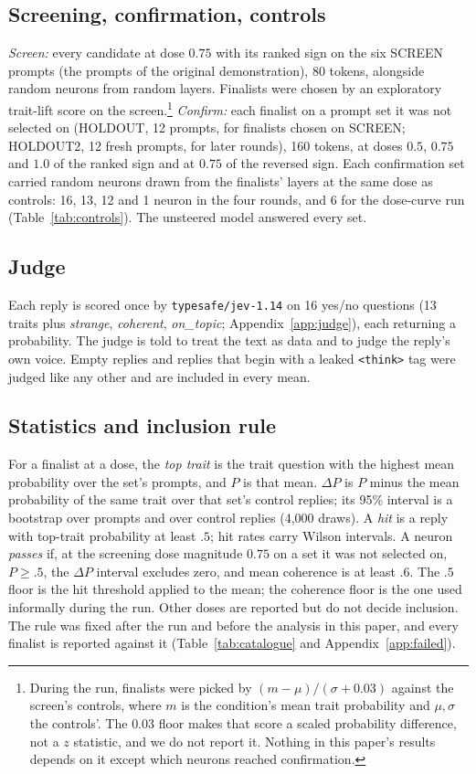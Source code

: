 \subsection{Screening, confirmation, controls}\label{sec:protocol}
\emph{Screen:} every candidate at dose $0.75$ with its ranked sign on the six SCREEN prompts (the prompts of
the original demonstration), 80 tokens, alongside random neurons from random layers. Finalists were chosen by
an exploratory trait-lift score on the screen.\footnote{During the run, finalists were picked by
$(m-\mu)/(\sigma+0.03)$ against the screen's controls, where $m$ is the condition's mean trait probability and
$\mu,\sigma$ the controls'. The $0.03$ floor makes that score a scaled probability difference, not a $z$
statistic, and we do not report it. Nothing in this paper's results depends on it except which neurons
reached confirmation.} \emph{Confirm:} each finalist on a prompt set it was not selected on (HOLDOUT, 12
prompts, for finalists chosen on SCREEN; HOLDOUT2, 12 fresh prompts, for later rounds), 160 tokens, at doses
$0.5$, $0.75$ and $1.0$ of the ranked sign and at $0.75$ of the reversed sign. Each confirmation set carried
random neurons drawn from the finalists' layers at the same dose as controls: 16, 13, 12 and 1 neuron in the
four rounds, and 6 for the dose-curve run (Table~\ref{tab:controls}). The unsteered model answered every set.

\subsection{Judge}\label{sec:judgemethod}
Each reply is scored once by \texttt{typesafe/jev-1.14} \citep{jev2026} on 16 yes/no questions (13 traits plus
\emph{strange}, \emph{coherent}, \emph{on\_topic}; Appendix~\ref{app:judge}), each returning a probability.
The judge is told to treat the text as data and to judge the reply's own voice. Empty replies and replies
that begin with a leaked \texttt{<think>} tag were judged like any other and are included in every mean.

\subsection{Statistics and inclusion rule}\label{sec:rule}
For a finalist at a dose, the \emph{top trait} is the trait question with the highest mean probability over
the set's prompts, and $P$ is that mean. $\Delta P$ is $P$ minus the mean probability of the same trait over
that set's control replies; its 95\% interval is a bootstrap over prompts and over control replies (4{,}000
draws). A \emph{hit} is a reply with top-trait probability at least $.5$; hit rates carry Wilson intervals.
A neuron \emph{passes} if, at the screening dose magnitude $0.75$ on a set it was not selected on, $P\ge .5$,
the $\Delta P$ interval excludes zero, and mean coherence is at least $.6$. The $.5$ floor is the hit
threshold applied to the mean; the coherence floor is the one used informally during the run. Other doses are
reported but do not decide inclusion. The rule was fixed after the run and before the analysis in this paper,
and every finalist is reported against it (Table~\ref{tab:catalogue} and Appendix~\ref{app:failed}).

